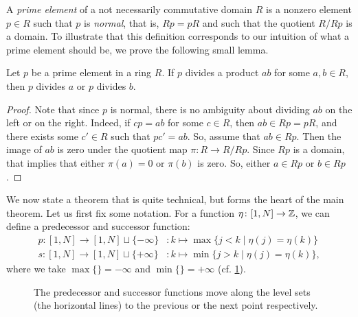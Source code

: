A \emph{prime element} of a not necessarily commutative domain $R$
is a nonzero element $p \in R$ such that $p$ is \emph{normal},
that is, $Rp = pR$ and such that the quotient $R / Rp$ is a domain. To illustrate that
this definition corresponds to our intuition of what a prime element should be, we
prove the following small lemma.
\begin{lemma}\label{lem:prime_divides_product}
	Let $p$ be a prime element in a ring $R$. If $p$ divides a product $ab$ for some $a,b
		\in R$, then $p$ divides $a$ or $p$ divides $b$.
\end{lemma}
\begin{proof}
	Note that since $p$ is normal, there is no ambiguity about dividing $ab$ on the left or
	on the right. Indeed, if $c p = ab$ for some $c \in R$, then $ab \in Rp = pR$, and
	there exists some $c' \in R$ such that $p c' = ab$. So, assume that $ab \in Rp$. Then
	the image of $ab$ is zero under the quotient map $\pi \colon R \to R/Rp$. Since $Rp$ is
	a domain, that implies that either $\pi(a) = 0$ or $\pi(b)$ is zero. So, either $a \in
		Rp$ or $b \in Rp$.
\end{proof}
%
We now state a theorem that is quite technical, but forms the heart of the main
theorem. Let us first fix some notation. For a function $\eta \colon [1, N] \to \mathbb{Z}$,
we can define a predecessor and successor
function:
\begin{align*}
	p \colon [1, N] \to [1, N] \sqcup \{-\infty\} & \colon k \mapsto  \max\{j < k \mid \eta(j) = \eta(k)\}  \\
	s \colon [1, N] \to [1, N] \sqcup \{+\infty\} & \colon k \mapsto  \min\{j > k \mid \eta(j) = \eta(k)\},
\end{align*}
%
where we take $\max \{\} = - \infty$ and $\min \{\}= + \infty$ (cf.
\cref{fig:predecessor_successor}).

\begin{figure}
	\centering
	\caption{The predecessor and successor functions move along the level sets (the horizontal lines) to the previous or the next point respectively.}
	\label{fig:predecessor_successor}
\end{figure}

